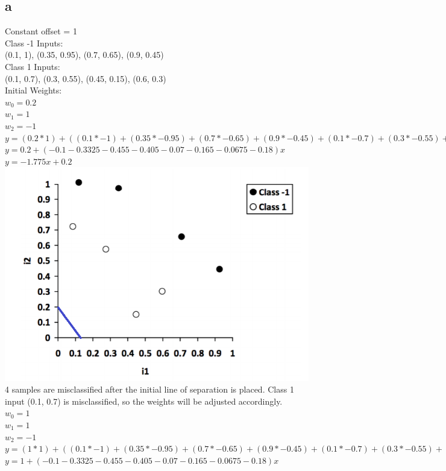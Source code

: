 \documentclass[11pt, oneside]{article}   	%
\begin{document}
\begin{flushleft}
\subsection*{a}
Constant offset = 1\\
Class -1 Inputs:\\
(0.1, 1), (0.35, 0.95), (0.7, 0.65), (0.9, 0.45)\\
Class 1 Inputs: \\
(0.1, 0.7), (0.3, 0.55), (0.45, 0.15), (0.6, 0.3)\\
Initial Weights:\\
$w_0 = 0.2$\\
$w_1 = 1$\\
$w_2 = -1$\\
$y=(0.2*1)+((0.1*-1)+(0.35*-0.95)+(0.7*-0.65)+(0.9*-0.45)+(0.1*-0.7)+(0.3*-0.55)+(0.45*-0.15)+(0.6*-0.3))x$\\
$y=0.2+(-0.1-0.3325-0.455-0.405-0.07-0.165-0.0675-0.18)x$\\
$y=-1.775x+0.2$\\
\includegraphics[]{q4_1.png}
\\
4 samples are misclassified after the initial line of separation is placed. Class 1 input (0.1, 0.7) is misclassified, so the weights will be adjusted accordingly.\\
$w_0 = 1$\\
$w_1 = 1$\\
$w_2 = -1$\\
$y=(1*1)+((0.1*-1)+(0.35*-0.95)+(0.7*-0.65)+(0.9*-0.45)+(0.1*-0.7)+(0.3*-0.55)+(0.45*-0.15)+(0.6*-0.3))x$\\
$y=1+(-0.1-0.3325-0.455-0.405-0.07-0.165-0.0675-0.18)x$\\

\end{flushleft}
\end{document}
